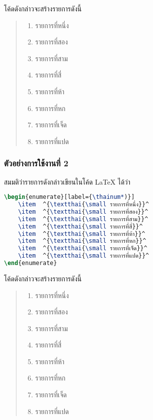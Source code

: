 \documentclass[10pt]{ltxguide}
\begin{document}
โค้ดดังกล่าวจะสร้างรายการดังนี้
\begin{quote}
    \color{DarkGray}
    \begin{enumerate}[topsep=0.25pc,itemsep=0pc,label={\thaialph*.}]
        \item  รายการที่หนึ่ง
        \item  รายการที่สอง
        \item  รายการที่สาม
        \item  รายการที่สี่
        \item  รายการที่ห้า
        \item  รายการที่หก
        \item  รายการที่เจ็ด
        \item  รายการที่แปด
    \end{enumerate}
\end{quote}

\subsubsection*{ตัวอย่างการใช้งานที่ 2}
สมมติว่ารายการดังกล่าวเขียนในโค้ด \textrm{\LaTeX} ได้ว่า
\begin{latintext}
\begin{lstlisting}[language=LaTeX,numbers=none,escapechar={\^},basicstyle=\linespread{1.5}\ttfamily,lineskip={6pt}]
\begin{enumerate}[label={\thainum*)}]
    \item  ^{\textthai{\small รายการที่หนึ่ง}}^
    \item  ^{\textthai{\small รายการที่สอง}}^
    \item  ^{\textthai{\small รายการที่สาม}}^
    \item  ^{\textthai{\small รายการที่สี่}}^
    \item  ^{\textthai{\small รายการที่ห้า}}^
    \item  ^{\textthai{\small รายการที่หก}}^
    \item  ^{\textthai{\small รายการที่เจ็ด}}^
    \item  ^{\textthai{\small รายการที่แปด}}^
\end{enumerate}
\end{lstlisting}
\end{latintext}

โค้ดดังกล่าวจะสร้างรายการดังนี้
\begin{quote}
    \color{DarkGray}
    \begin{enumerate}[topsep=0.25pc,itemsep=0pc,label={\thainum*)}]
        \item  รายการที่หนึ่ง
        \item  รายการที่สอง
        \item  รายการที่สาม
        \item  รายการที่สี่
        \item  รายการที่ห้า
        \item  รายการที่หก
        \item  รายการที่เจ็ด
        \item  รายการที่แปด
    \end{enumerate}
\end{quote}
\end{document}
